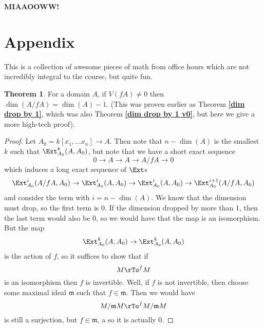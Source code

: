 \documentclass[12 pt]{article}
\theoremstyle{definition}
\newtheorem{thm}{Theorem}[section]
\renewcommand{\(}{\left(}
\renewcommand{\)}{\right)}
\newcommand\fm{{\mathfrak m}}
\begin{document}
\textcolor[rgb]{1.00,0.00,0.00}{\textbf{MIAAOOWW!}}






\newpage








\section{Appendix}

This is a collection of awesome pieces of math from office hours which are not incredibly integral to the course, but quite fun.


\begin{thm} For a domain $A$, if $V(fA) \neq 0$ then $\dim(A/fA)=\dim(A)-1$. (This was proven earlier as Theorem \textbf{\ref{dim drop by 1}}, which was also Theorem \textbf{\ref{dim drop by 1 v0}}, but here we give a more high-tech proof).
\end{thm}
\begin{proof}  Let $A_0=k[x_1, \ldots x_n] \to A$. Then note that $n-\dim(A)$ is the smallest $k$ such that $\Ext_{A_0}^k(A,A_0)$, but note that we have a short exact sequence
\[0 \to A \to A \to A/fA \to 0\]
which induces a long exact sequence of $\Ext$s
\[\Ext^{i}_{A_0}(A/fA,A_0) \to \Ext^i_{A_0}(A, A_0) \to \Ext^i_{A_0}(A,A_0) \to \Ext^{i+1}_{A_0}(A/fA, A_0)\]
and consider the term with $i=n-\dim(A)$. We know that the dimension must drop, so the first term is 0. If the dimension dropped by more than 1, then the last term would also be 0, so we would have that the map is an isomorphism. But the map
\[\Ext^k_{A_0}(A,A_0) \to \Ext^k_{A_0}(A,A_0)\]
is the action of $f$, so it suffices to show that if
\[M \rTo^f M\]
is an isomorphism then $f$ is invertible. Well, if $f$ is not invertible, then choose some maximal ideal $\fm$ such that $f \in \fm$. Then we would have
\[M/\fm M \rTo^f M/\fm M\]
is still a surjection, but $f \in \fm$, a so it is actually 0.
\end{proof}
\end{document}
